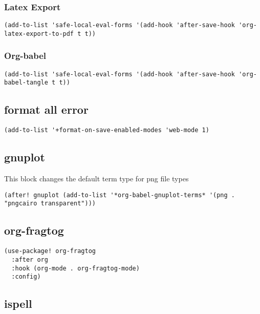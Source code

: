\documentclass[11pt]{article}
\begin{document}
\subsubsection*{Latex Export}
\label{sec:org49ac0df}
\begin{verbatim}
(add-to-list 'safe-local-eval-forms '(add-hook 'after-save-hook 'org-latex-export-to-pdf t t))
\end{verbatim}
\subsubsection*{Org-babel}
\label{sec:org329f61c}
\begin{verbatim}
(add-to-list 'safe-local-eval-forms '(add-hook 'after-save-hook 'org-babel-tangle t t))
\end{verbatim}
\subsection*{format all error}
\label{sec:org220b226}
\begin{verbatim}
(add-to-list '+format-on-save-enabled-modes 'web-mode 1)
\end{verbatim}
\subsection*{gnuplot}
\label{sec:orgf368232}
This block changes the default term type for png file types
\begin{verbatim}
(after! gnuplot (add-to-list '*org-babel-gnuplot-terms* '(png . "pngcairo transparent")))
\end{verbatim}
\subsection*{org-fragtog}
\label{sec:org421d8b0}
\begin{verbatim}
(use-package! org-fragtog
  :after org
  :hook (org-mode . org-fragtog-mode)
  :config)
\end{verbatim}
\subsection*{ispell}
\label{sec:org07cba94}
\end{document}
